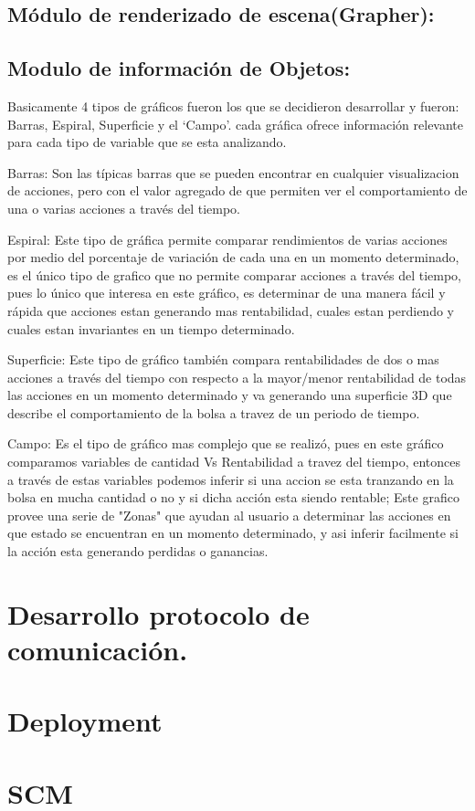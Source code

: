 \subsection{Módulo de renderizado de escena(Grapher):}

\subsection{Modulo de información de Objetos:}



Basicamente 4 tipos de gráficos fueron los que se decidieron desarrollar y fueron: Barras, Espiral, Superficie y el `Campo'. cada gráfica ofrece información relevante para cada tipo de variable que se esta analizando. 

Barras: Son las típicas barras que se pueden encontrar en cualquier visualizacion de acciones, pero con el valor agregado de que permiten ver el comportamiento de una o varias acciones a través del tiempo.

Espiral: Este tipo de gráfica permite comparar rendimientos de varias acciones por medio del porcentaje de variación de cada una en un momento determinado, es el único tipo de grafico que no permite comparar acciones a través del tiempo, pues lo único que interesa en este gráfico, es determinar de una manera fácil y rápida que acciones estan generando mas rentabilidad, cuales estan perdiendo y cuales estan invariantes en un tiempo determinado.

Superficie: Este tipo de gráfico también compara rentabilidades de dos o mas acciones a través del tiempo con respecto a la mayor/menor  rentabilidad de todas las acciones en un momento determinado  y va generando una superficie 3D que describe el comportamiento de la bolsa a travez de un periodo de tiempo.

Campo: Es el tipo de gráfico mas complejo que se realizó, pues en este gráfico comparamos variables de cantidad Vs Rentabilidad a travez del tiempo, entonces a través de estas variables podemos inferir si una accion se esta tranzando en la bolsa en mucha cantidad o no y si dicha acción esta siendo rentable; Este grafico provee una serie de "Zonas" que ayudan al usuario a determinar las acciones en que estado se encuentran en un momento determinado, y asi inferir facilmente si la acción esta generando perdidas o ganancias.

 

\section{Desarrollo protocolo de comunicación.}

\section{Deployment}

\section{SCM}